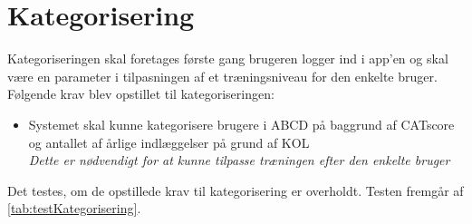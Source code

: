 \section{Kategorisering}
Kategoriseringen skal foretages første gang brugeren logger ind i app'en og skal være en parameter i tilpasningen af et træningsniveau for den enkelte bruger. Følgende krav blev opstillet til kategoriseringen:

\begin{itemize}
\item Systemet skal kunne kategorisere brugere i ABCD på baggrund af CATscore og antallet af årlige indlæggelser på grund af KOL
\\
\textit{Dette er nødvendigt for at kunne tilpasse træningen efter den enkelte bruger}
\end{itemize}

\noindent
Det testes, om de opstillede krav til kategorisering er overholdt. Testen fremgår af \autoref{tab:testKategorisering}.

